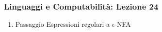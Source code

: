 




\begin{frame}[fragile]
	\frametitle{Linguaggi e Computabilità: Lezione 24}
\begin{enumerate}
\item
Passaggio Espressioni regolari a $\epsilon$-NFA
\end{enumerate}
\end{frame}



